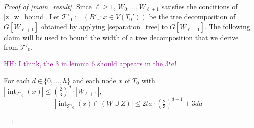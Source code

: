 \documentclass{patmorin}
\DeclareMathOperator{\sep}{sn}
\DeclareMathOperator{\interior}{int}
\newcommand{\hussein}[1]{\textcolor{purple}{HH: #1}}
\begin{document}
\begin{proof}[Proof of \cref{main_result}]
  Since $\ell \ge 1$, $W_0,\ldots,W_{\ell+1}$ satisfies the conditions of \cref{z_w_bound}.
  Let $\mathcal{T}'_0:=(B'_x:x\in V(T_0'))$ be the tree decomposition of $G[W_{\ell+1}]$ obtained by applying \cref{separation_tree} to $G[W_{\ell+1}]$.  The following claim will be used to bound the width of a tree decomposition that we derive from $\mathcal{T}'_0$.

\hussein{I think, the 3 in lemma 6 should appears in the $3ta$!}
  \begin{clm} \label{cell_bound}
     For each $d\in\{0,\ldots,h\}$ and
     each node $x$ of $T_0$ with $|\interior_{\mathcal{T}'_0}(x)|\le (\tfrac{2}{3})^d\cdot |W_{\ell+1}|$,
     \begin{equation}
       |\interior_{\mathcal{T}'_0}(x)\cap (W\cup Z)|  \le 2ta\cdot (\tfrac{2}{3})^{d-1}+3da \label{t_bound}
     \end{equation}
   \end{clm}



\end{proof}
\end{document}
